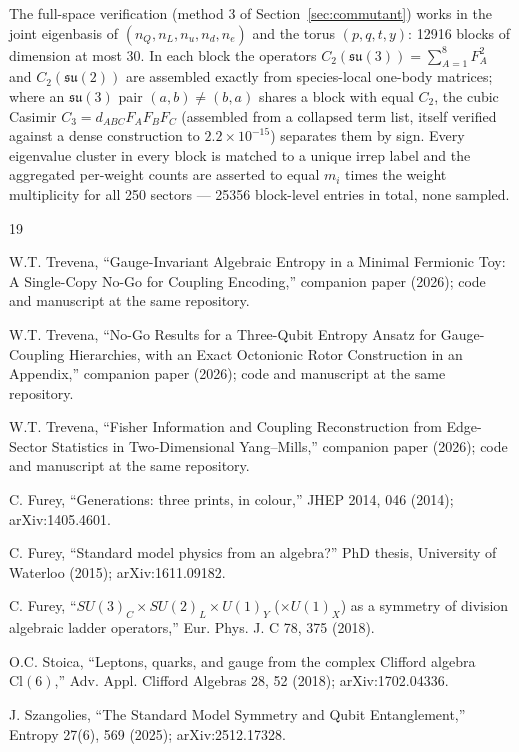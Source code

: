 \documentclass[11pt]{article}
\newcommand{\su}[1]{\mathfrak{su}(#1)}
\begin{document}
The full-space verification (method 3 of Section~\ref{sec:commutant}) works in the joint eigenbasis of $(n_Q,n_L,n_u,n_d,n_e)$ and the torus $(p,q,t,y)$: 12916 blocks of dimension at most 30. In each block the operators $C_2(\su3) = \sum_{A=1}^{8} F_A^2$ and $C_2(\su2)$ are assembled exactly from species-local one-body matrices; where an $\su3$ pair $(a,b)\neq(b,a)$ shares a block with equal $C_2$, the cubic Casimir $C_3 = d_{ABC}F_AF_BF_C$ (assembled from a collapsed term list, itself verified against a dense construction to $2.2\times10^{-15}$) separates them by sign. Every eigenvalue cluster in every block is matched to a unique irrep label and the aggregated per-weight counts are asserted to equal $m_i$ times the weight multiplicity for all 250 sectors --- 25356 block-level entries in total, none sampled.

\begin{thebibliography}{19}

 W.T. Trevena, ``Gauge-Invariant Algebraic Entropy in a Minimal Fermionic Toy: A Single-Copy No-Go for Coupling Encoding,'' companion paper (2026); code and manuscript at the same repository.

 W.T. Trevena, ``No-Go Results for a Three-Qubit Entropy Ansatz for Gauge-Coupling Hierarchies, with an Exact Octonionic Rotor Construction in an Appendix,'' companion paper (2026); code and manuscript at the same repository.

 W.T. Trevena, ``Fisher Information and Coupling Reconstruction from Edge-Sector Statistics in Two-Dimensional Yang--Mills,'' companion paper (2026); code and manuscript at the same repository.

 C. Furey, ``Generations: three prints, in colour,'' JHEP 2014, 046 (2014); arXiv:1405.4601.

 C. Furey, ``Standard model physics from an algebra?'' PhD thesis, University of Waterloo (2015); arXiv:1611.09182.

 C. Furey, ``$SU(3)_C \times SU(2)_L \times U(1)_Y$ ($\times U(1)_X$) as a symmetry of division algebraic ladder operators,'' Eur. Phys. J. C 78, 375 (2018).

 O.C. Stoica, ``Leptons, quarks, and gauge from the complex Clifford algebra $\mathrm{Cl}(6)$,'' Adv. Appl. Clifford Algebras 28, 52 (2018); arXiv:1702.04336.

 J. Szangolies, ``The Standard Model Symmetry and Qubit Entanglement,'' Entropy 27(6), 569 (2025); arXiv:2512.17328.


\end{thebibliography}
\end{document}
